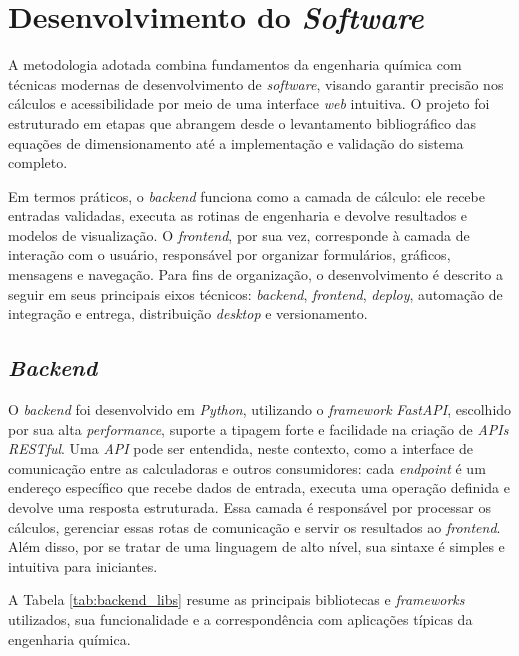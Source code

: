\section{Desenvolvimento do \textit{Software}}

A metodologia adotada combina fundamentos da engenharia química com técnicas modernas de desenvolvimento de \textit{software}, visando garantir precisão nos cálculos e acessibilidade por meio de uma interface \textit{web} intuitiva. O projeto foi estruturado em etapas que abrangem desde o levantamento bibliográfico das equações de dimensionamento até a implementação e validação do sistema completo.

Em termos práticos, o \textit{backend} funciona como a camada de cálculo: ele recebe entradas validadas, executa as rotinas de engenharia e devolve resultados e modelos de visualização. O \textit{frontend}, por sua vez, corresponde à camada de interação com o usuário, responsável por organizar formulários, gráficos, mensagens e navegação. Para fins de organização, o desenvolvimento é descrito a seguir em seus principais eixos técnicos: \textit{backend}, \textit{frontend}, \textit{deploy}, automação de integração e entrega, distribuição \textit{desktop} e versionamento.

\subsection{\textit{Backend}}

O \textit{backend} foi desenvolvido em \textit{Python}, utilizando o \textit{framework} \textit{FastAPI}, escolhido por sua alta \textit{performance}, suporte a tipagem forte e facilidade na criação de \textit{APIs RESTful}. Uma \textit{API} pode ser entendida, neste contexto, como a interface de comunicação entre as calculadoras e outros consumidores: cada \textit{endpoint} é um endereço específico que recebe dados de entrada, executa uma operação definida e devolve uma resposta estruturada. Essa camada é responsável por processar os cálculos, gerenciar essas rotas de comunicação e servir os resultados ao \textit{frontend}. Além disso, por se tratar de uma linguagem de alto nível, sua sintaxe é simples e intuitiva para iniciantes.

A Tabela \ref{tab:backend_libs} resume as principais bibliotecas e \textit{frameworks} utilizados, sua funcionalidade e a correspondência com aplicações típicas da engenharia química.

